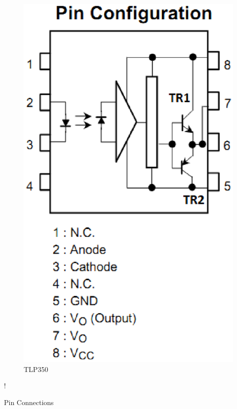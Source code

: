 \documentclass[journal,12pt,twocolumn]{IEEEtran}
\begin{document}
\begin{figure}[!h]
\centering
\includegraphics[width=\columnwidth]{./figs/pinout.eps}
\caption{ TLP350}  
\label{fig5}
\end{figure}

\begin{table}[!h]
\centering
\resizebox {\columnwidth} {!} {

}
\caption{Pin Connections} 
\label{table:connections}
\end{table}  
\end{document}

